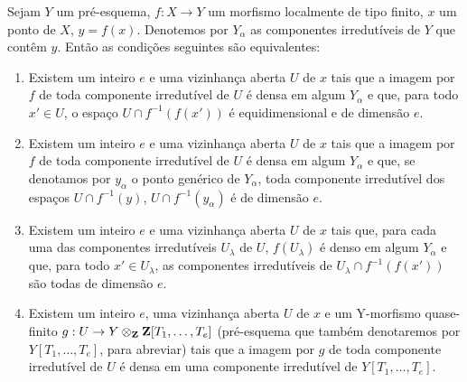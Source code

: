 \begin{proposition}[13.3.1]
\label{IV.13.3.1}
Sejam $Y$ um pré-esquema, $f:X\to Y$ um morfismo localmente de tipo finito,
$x$ um ponto de $X$, $y=f(x)$.
Denotemos por $Y_\alpha$ as componentes irredutíveis de $Y$ que contêm $y$.
Então as condições seguintes são equivalentes:
\begin{enumerate}[label=\emph{\alph*)}]
  \item Existem um inteiro $e$ e uma vizinhança aberta $U$ de $x$ tais que
  a imagem por $f$ de toda componente irredutível de $U$ é densa em algum
  $Y_\alpha$ e que, para todo $x'\in U$, o espaço
  $U\cap f^{-1}(f(x'))$ é equidimensional e de dimensão $e$.
  \item[\emph{a$'$)}] Existem um inteiro $e$ e uma vizinhança aberta $U$
  de $x$ tais que a imagem por $f$ de toda componente irredutível de $U$
  é densa em algum $Y_\alpha$ e que, se denotamos por $y_\alpha$ o ponto
  genérico de $Y_\alpha$, toda componente irredutível dos espaços
  $U\cap f^{-1}(y)$, $U\cap f^{-1}(y_\alpha)$ é de dimensão $e$.
  \item[\emph{a$''$)}] Existem um inteiro $e$ e uma vizinhança aberta $U$
  de $x$ tais que, para cada uma das componentes irredutíveis $U_\lambda$
  de $U$, $f(U_\lambda)$ é denso em algum $Y_\alpha$ e que, para todo
  $x'\in U_\lambda$, as componentes irredutíveis de
  $U_\lambda\cap f^{-1}(f(x'))$ são todas de dimensão $e$.
  \item Existem um inteiro $e$, uma vizinhança aberta $U$ de $x$ e um
  $\mathrm Y$-morfismo quase-finito
  $g:U\to Y\otimes_{\bb{Z}}\bb{Z}[T_1,\ldots,T_e]$
  (pré-esquema que também denotaremos por $Y[T_1,\ldots,T_e]$, para abreviar)
  tais que a imagem por $g$ de toda componente irredutível de $U$ é densa
  em uma componente irredutível de $Y[T_1,\ldots,T_e]$.
\end{enumerate}
\end{proposition}

